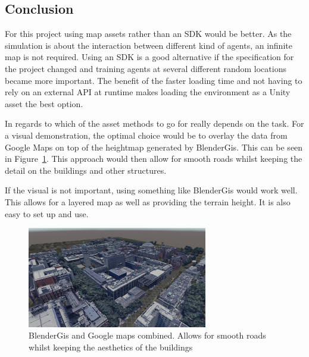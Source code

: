 \subsection{Conclusion}
For this project using map assets rather than an SDK would be better. As the simulation is about the interaction between different kind of agents, an infinite map is not required. Using an SDK is a good alternative if the specification for the project changed and training agents at several different random locations became more important. The benefit of the faster loading time and not having to rely on an external API at runtime makes loading the environment as a Unity asset the best option. 

In regards to which of the asset methods to go for really depends on the task. For a visual demonstration, the optimal choice would be to overlay the data from Google Maps on top of the heightmap generated by BlenderGis. This can be seen in Figure~\ref{maps:figure:combined}. This approach would then allow for smooth roads whilst keeping the detail on the buildings and other structures. 

If the visual is not important, using something like BlenderGis would work well. This allows for a layered map as well as providing the terrain height. It is also easy to set up and use. 

\begin{figure}[H]
    \centering
    \includegraphics[width=0.7\textwidth]{06_Implementation/00_Maps/Images/CombinedCropped.JPG}
    \caption{BlenderGis and Google maps combined. Allows for smooth roads whilst keeping the aesthetics of the buildings}
    \label{maps:figure:combined}
\end{figure}
